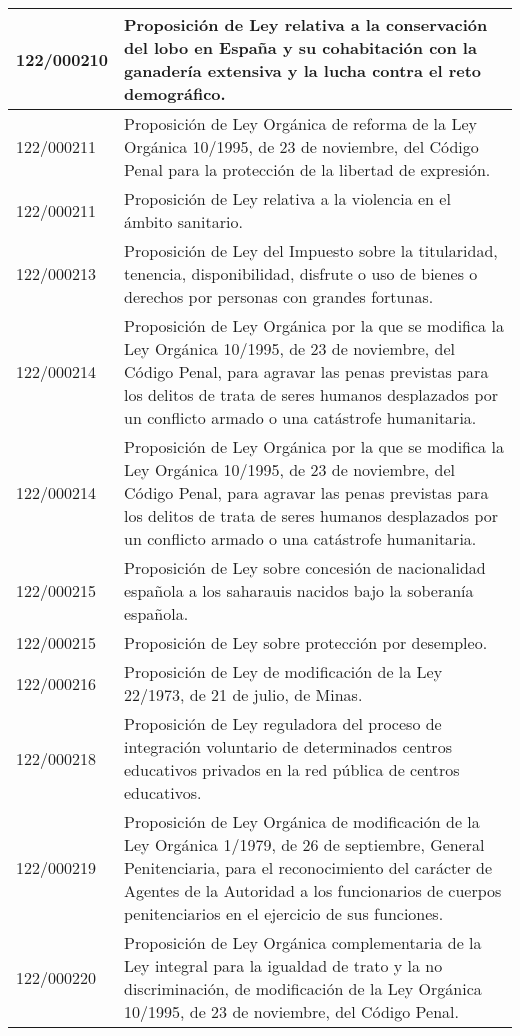 {\begin{table}[H]
\begin{center}
\begin{tabularx}{\linewidth}{| l | X |}
\hline
122/000210 & Proposición de Ley relativa a la conservación del lobo en España y su cohabitación con la ganadería extensiva y la lucha contra el reto demográfico. \\
\hline
122/000211 & Proposición de Ley Orgánica de reforma de la Ley Orgánica 10/1995, de 23 de noviembre, del Código Penal para la protección de la libertad de expresión. \\
\hline
122/000211 & Proposición de Ley relativa a la violencia en el ámbito sanitario. \\
\hline
122/000213 & Proposición de Ley del Impuesto sobre la titularidad, tenencia, disponibilidad, disfrute o uso de bienes o derechos por personas con grandes fortunas. \\
\hline
122/000214 & Proposición de Ley Orgánica por la que se modifica la Ley Orgánica 10/1995, de 23 de noviembre, del Código Penal, para agravar las penas previstas para los delitos de trata de seres humanos desplazados por un conflicto armado o una catástrofe humanitaria. \\
\hline
122/000214 & Proposición de Ley Orgánica por la que se modifica la Ley Orgánica 10/1995, de 23 de noviembre, del Código Penal, para agravar las penas previstas para los delitos de trata de seres humanos desplazados por un conflicto armado o una catástrofe humanitaria. \\
\hline
122/000215 & Proposición de Ley sobre concesión de nacionalidad española a los saharauis nacidos bajo la soberanía española. \\
\hline
122/000215 & Proposición de Ley sobre protección por desempleo. \\
\hline
122/000216 & Proposición de Ley de modificación de la Ley 22/1973, de 21 de julio, de Minas. \\
\hline
122/000218 & Proposición de Ley reguladora del proceso de integración voluntario de determinados centros educativos privados en la red pública de centros educativos. \\
\hline
122/000219 & Proposición de Ley Orgánica de modificación de la Ley Orgánica 1/1979, de 26 de septiembre, General Penitenciaria, para el reconocimiento del carácter de Agentes de la Autoridad a los funcionarios de cuerpos penitenciarios en el ejercicio de sus funciones. \\
\hline
122/000220 & Proposición de Ley Orgánica complementaria de la Ley integral para la igualdad de trato y la no discriminación, de modificación de la Ley Orgánica 10/1995, de 23 de noviembre, del Código Penal. \\

\end{tabularx}
\end{center}
\end{table}}
